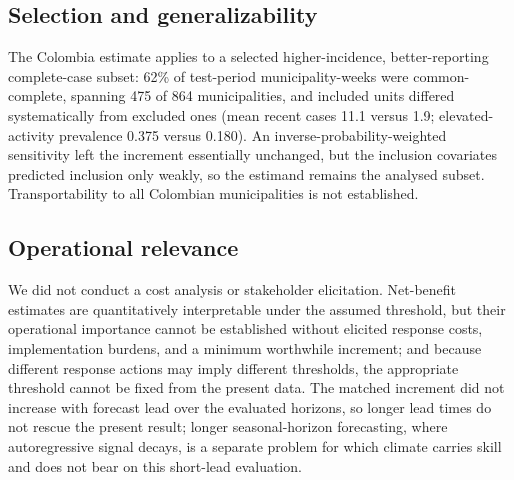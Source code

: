 \documentclass[11pt,a4paper]{article}
\begin{document}
\subsection*{Selection and generalizability}
The Colombia estimate applies to a selected higher-incidence, better-reporting complete-case subset: 62\% of test-period municipality-weeks were common-complete, spanning 475 of 864 municipalities, and included units differed systematically from excluded ones (mean recent cases 11.1 versus 1.9; elevated-activity prevalence 0.375 versus 0.180). An inverse-probability-weighted sensitivity left the increment essentially unchanged, but the inclusion covariates predicted inclusion only weakly, so the estimand remains the analysed subset. Transportability to all Colombian municipalities is not established.

\subsection*{Operational relevance}
We did not conduct a cost analysis or stakeholder elicitation. Net-benefit estimates are quantitatively interpretable under the assumed threshold, but their operational importance cannot be established without elicited response costs, implementation burdens, and a minimum worthwhile increment; and because different response actions may imply different thresholds, the appropriate threshold cannot be fixed from the present data. The matched increment did not increase with forecast lead over the evaluated horizons, so longer lead times do not rescue the present result; longer seasonal-horizon forecasting, where autoregressive signal decays, is a separate problem for which climate carries skill~\cite{Beal2025,ColonGonzalez2021,Campbell2026} and does not bear on this short-lead evaluation.
\end{document}
